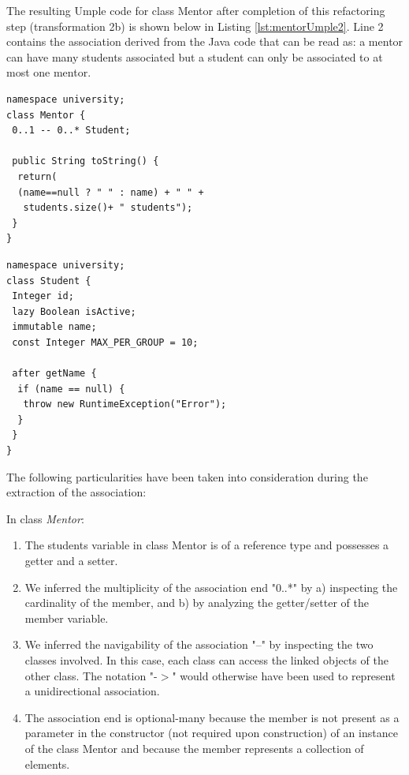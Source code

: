 The resulting Umple code for class Mentor after completion of this refactoring step (transformation 2b) is shown below in Listing \ref{lst:mentorUmple2}. Line 2 contains the association derived from the Java code that can be read as: a mentor can have many students associated but a student can only be associated to at most one mentor. 

\begin{lstlisting}[style=UmpleOut,caption=Mentor.ump,label=lst:mentorUmple2]
namespace university;
class Mentor {
 0..1 -- 0..* Student; 
 
 public String toString() {
  return(
  (name==null ? " " : name) + " " +
   students.size()+ " students");
 }
}
\end{lstlisting}

\begin{lstlisting}[style=UmpleOut,caption=Student.ump,label=lst:studentUmple2]
namespace university;
class Student {
 Integer id; 
 lazy Boolean isActive; 
 immutable name; 
 const Integer MAX_PER_GROUP = 10; 
 
 after getName {
  if (name == null) { 
   throw new RuntimeException("Error");
  }
 }
}
\end{lstlisting}

The following particularities have been taken into consideration during the extraction of the association:

In class \textit{Mentor}:
\begin{enumerate}
\item The students variable in class Mentor is of a reference type and possesses a getter and a setter.
\item We inferred the multiplicity of the association end "0..*" by a) inspecting the cardinality of the member, and b) by analyzing the getter/setter of the member variable.
\item We inferred the navigability of the association "--" by inspecting the two classes involved. In this case, each class can access the linked objects of the other class.  The notation "-$>$" would otherwise have been used to represent a unidirectional association. 


\item The association end is optional-many because the member is not present as a parameter in the constructor (not required upon construction) of an instance of the class Mentor and because the member represents a collection of elements. 
\end{enumerate}

